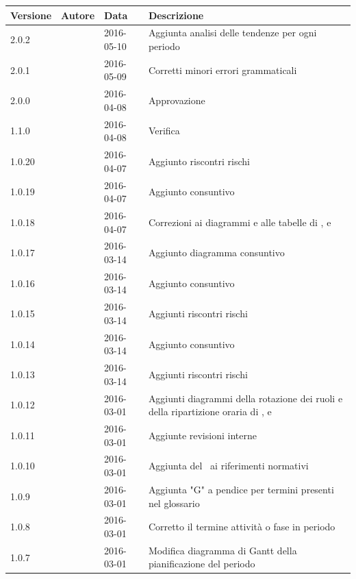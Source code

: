 \documentclass[12pt,a4paper]{article}
\begin{document}
\begin{center}
	\begin{longtable}[H]{p{} p{} p{} p{}}
		\toprule
		\textbf{Versione} & \textbf{Autore} & \textbf{Data}	&	\textbf{Descrizione}\\*
		\midrule
		\midrule
		2.0.2 & \TP{} & 2016-05-10 & Aggiunta analisi delle tendenze per ogni periodo \\*
		\midrule
		2.0.1 & \TP{} & 2016-05-09 & Corretti minori errori grammaticali \\*
        \midrule
        2.0.0 & \TP{} & 2016-04-08 & Approvazione \\*
   		\midrule
   		1.1.0 & \NDC{} & 2016-04-08 & Verifica \\*
		\midrule
		1.0.20 & \TP{} & 2016-04-07 & Aggiunto riscontri rischi \FPD{} \\*
		\midrule
		1.0.19 & \TP{} & 2016-04-07 & Aggiunto consuntivo \FPD{} \\*
		\midrule
		1.0.18 & \TP{} & 2016-04-07 & Correzioni ai diagrammi e alle tabelle di \FAD, \FPA e \FPD{} \\*
		\midrule
		1.0.17 & \AB{} & 2016-03-14 & Aggiunto diagramma consuntivo \FPA \\*
        \midrule
	    1.0.16 & \AB{} & 2016-03-14 & Aggiunto consuntivo \FPA{} \\*
        \midrule
        1.0.15 & \AB{} & 2016-03-14 & Aggiunti riscontri rischi \FPA{} \\*
        \midrule
        1.0.14 & \AB{} & 2016-03-14 & Aggiunto consuntivo \FAD{} \\*
        \midrule
        1.0.13 & \AB{} & 2016-03-14 & Aggiunti riscontri rischi \FAD{} \\*
        \midrule
	    1.0.12 & \AB{} & 2016-03-01 & Aggiunti diagrammi della rotazione dei ruoli e della ripartizione oraria di \FAD, \FPA e \FPD{} \\*
        \midrule
        1.0.11 & \AB{} & 2016-03-01 & Aggiunte revisioni interne \\*
		\midrule
		1.0.10 & \AB{} & 2016-03-01 & Aggiunta del \PdQ\ ai riferimenti normativi \\*		
		\midrule
		1.0.9 & \AB{} & 2016-03-01 & Aggiunta "G" a pendice per termini presenti nel glossario \\*
		\midrule
		1.0.8 & \AB{} & 2016-03-01 & Corretto il termine attività o fase in periodo \\*
		\midrule
		1.0.7 & \AB{} & 2016-03-01 & Modifica diagramma di Gantt della pianificazione del periodo \FP\  \\*

\end{longtable}
\end{center}
\end{document}
